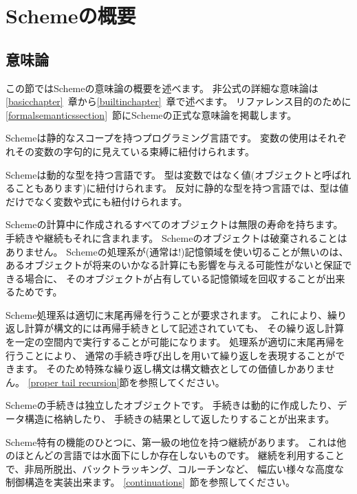 
\chapter{Schemeの概要}

\section{意味論}
\label{semanticsection}

この節ではSchemeの意味論の概要を述べます。
非公式の詳細な意味論は\ref{basicchapter}~章から\ref{builtinchapter}~章で述べます。
リファレンス目的のために\ref{formalsemanticssection}~節にSchemeの正式な意味論を掲載します。

\vest Schemeは静的なスコープを持つプログラミング言語です。
変数の使用はそれぞれその変数の字句的に見えている束縛に紐付けられます。

\vest Schemeは動的な型を持つ言語です。
型は変数ではなく値(オブジェクトと呼ばれることもあります)に紐付けられます。
反対に静的な型を持つ言語では、型は値だけでなく変数や式にも紐付けられます。

\vest Schemeの計算中に作成されるすべてのオブジェクトは無限の寿命を持ちます。
手続きや継続もそれに含まれます。
Schemeのオブジェクトは破棄されることはありません。
Schemeの処理系が(通常は!)記憶領域を使い切ることが無いのは、
あるオブジェクトが将来のいかなる計算にも影響を与える可能性がないと保証できる場合に、
そのオブジェクトが占有している記憶領域を回収することが出来るためです。

\vest Scheme処理系は適切に末尾再帰を行うことが要求されます。
これにより、繰り返し計算が構文的には再帰手続きとして記述されていても、
その繰り返し計算を一定の空間内で実行することが可能になります。
処理系が適切に末尾再帰を行うことにより、
通常の手続き呼び出しを用いて繰り返しを表現することができます。
そのため特殊な繰り返し構文は構文糖衣としての価値しかありません。
\ref{proper tail recursion}節を参照してください。

\vest Schemeの手続きは独立したオブジェクトです。
手続きは動的に作成したり、データ構造に格納したり、
手続きの結果として返したりすることが出来ます。

\vest Scheme特有の機能のひとつに、第一級の地位を持つ継続があります。
これは他のほとんどの言語では水面下にしか存在しないものです。
継続を利用することで、非局所脱出、バックトラッキング、コルーチンなど、
幅広い様々な高度な制御構造を実装出来ます。
\ref{continuations}~節を参照してください。

